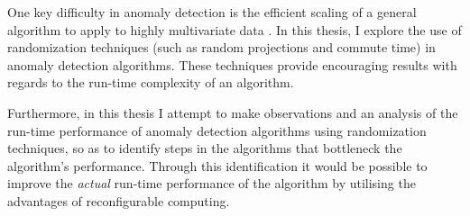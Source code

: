 One key difficulty in anomaly detection is the efficient scaling of a general
algorithm to apply to highly multivariate data \citeNeeded. In this thesis, I
explore the use of randomization techniques (such as random projections and 
commute time) in anomaly detection algorithms. These techniques provide
encouraging results with regards to the run-time complexity of an algorithm.

Furthermore, in this thesis I attempt to make observations and an analysis of
the run-time performance of anomaly detection algorithms using randomization
techniques, so as to identify steps in the algorithms that bottleneck the
algorithm's performance. Through this identification it would be possible to
improve the \emph{actual} run-time performance of the algorithm by utilising the
advantages of reconfigurable computing.
